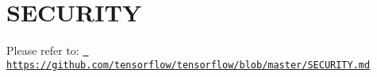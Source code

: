 \chapter{SECURITY}
\hypertarget{md__arduino_2_get_started_with_machine_learning_on_arduino_2tflite-micro-main_2_s_e_c_u_r_i_t_y}{}\label{md__arduino_2_get_started_with_machine_learning_on_arduino_2tflite-micro-main_2_s_e_c_u_r_i_t_y}
Please refer to\+: \href{https://github.com/tensorflow/tensorflow/blob/master/SECURITY.md}{\texttt{ https\+://github.\+com/tensorflow/tensorflow/blob/master/\+SECURITY.\+md}} 
